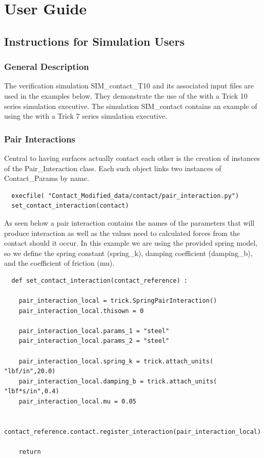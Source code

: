 %
%
%
%

\chapter{User Guide}\label{ch:user}

\section{Instructions for Simulation Users}
\subsection{General Description}
The verification simulation SIM\_contact\_T10 and its associated input files are used in the examples below.  They demonstrate the use of the \ModelDesc with a Trick 10 series simulation executive.  The simulation SIM\_contact contains an example of using the \ModelDesc with a Trick 7 series simulation executive.

\subsection{Pair Interactions}
Central to having surfaces actually contact each other is the creation of instances of the Pair\_Interaction class.  Each such object links two instances of Contact\_Params by name.
\begin{verbatim}
  execfile( "Contact_Modified_data/contact/pair_interaction.py")
  set_contact_interaction(contact)
\end{verbatim}

As seen below a pair interaction contains the names of the parameters that will produce interaction as well as the values need to calculated forces from the contact should it occur.  In this example we are using the \ModelDesc provided spring model, so we define the spring constant (spring\_k), damping coefficient (damping\_b), and the coefficient of friction (mu).
\begin{verbatim}
  def set_contact_interaction(contact_reference) :

    pair_interaction_local = trick.SpringPairInteraction()
    pair_interaction_local.thisown = 0

    pair_interaction_local.params_1 = "steel"
    pair_interaction_local.params_2 = "steel"

    pair_interaction_local.spring_k = trick.attach_units( "lbf/in",20.0)
    pair_interaction_local.damping_b = trick.attach_units( "lbf*s/in",0.4)
    pair_interaction_local.mu = 0.05

    contact_reference.contact.register_interaction(pair_interaction_local)

    return
\end{verbatim}

